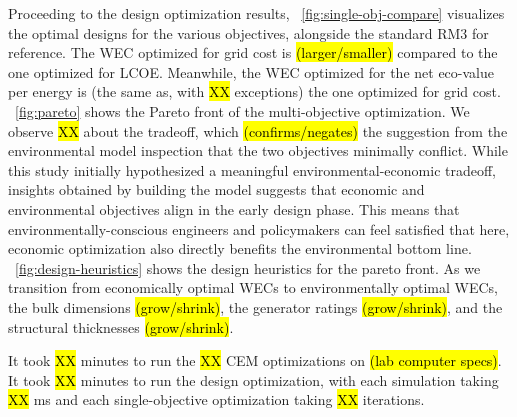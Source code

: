 \documentclass[10pt,twoside]{article}
\newif\ifplaceholder
\begin{document}
Proceeding to the design optimization results, \figureautorefname~\ref{fig:single-obj-compare} visualizes the optimal designs for the various objectives, alongside the standard RM3 for reference.
The WEC optimized for grid cost is \hl{(larger/smaller)} compared to the one optimized for LCOE.
Meanwhile, the WEC optimized for the net eco-value per energy is (the same as, with \hl{XX} exceptions) the one optimized for grid cost.
\figureautorefname~\ref{fig:pareto} shows the Pareto front of the multi-objective optimization.
We observe \hl{XX} about the tradeoff, which \hl{(confirms/negates)} the suggestion from the environmental model inspection that the two objectives minimally conflict.
While this study initially hypothesized a meaningful environmental-economic tradeoff, insights obtained by building the model suggests that economic and environmental objectives align in the early design phase.
This means that environmentally-conscious engineers and policymakers can feel satisfied that here, economic optimization also directly benefits the environmental bottom line.
\figureautorefname~\ref{fig:design-heuristics} shows the design heuristics for the pareto front.
As we transition from economically optimal WECs to environmentally optimal WECs, the bulk dimensions \hl{(grow/shrink)}, the generator ratings \hl{(grow/shrink)}, and the structural thicknesses \hl{(grow/shrink)}.

It took \hl{XX} minutes to run the \hl{XX} CEM optimizations on \hl{(lab computer specs)}.
It took \hl{XX} minutes to run the design optimization, with each simulation taking \hl{XX} ms and each single-objective optimization taking \hl{XX} iterations.

\end{document}
